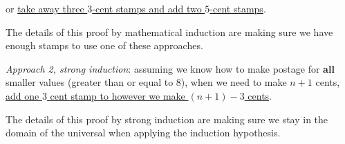 \documentclass[12pt, oneside]{article}
\begin{document}
\vspace{-10pt}
or \underline{take away three $3$-cent stamps and add two $5$-cent stamps}.

\vspace{-10pt}
The details of this proof by mathematical induction
are making sure we have enough 
stamps to use one of these approaches.

{\it Approach 2, strong induction}: assuming we know how to make postage
for {\bf all} smaller values (greater than or equal to $8$), when
we need to make $n+1$ cents, \underline{add one $3$ cent stamp to 
however we make $(n+1) - 3$ cents}.

\vspace{-10pt}
The details of this proof by strong induction are making sure we 
stay in the domain of the universal when applying the induction hypothesis.
 \newpage
\end{document}
